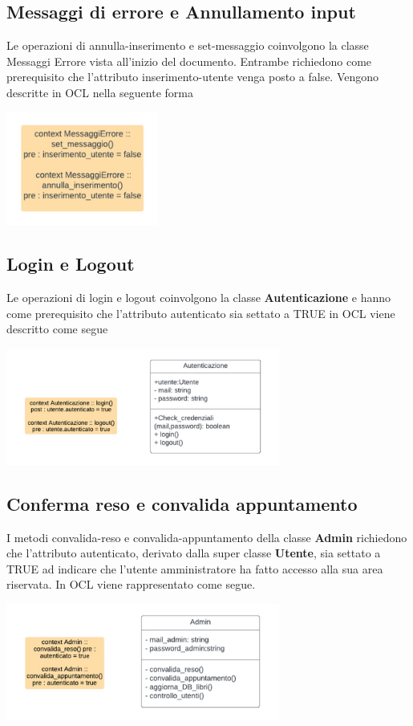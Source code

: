 \documentclass{article}
\begin{document}
\subsection{Messaggi di errore e Annullamento input}
Le operazioni di annulla-inserimento e set-messaggio coinvolgono la classe Messaggi Errore vista all'inizio del documento.
Entrambe richiedono come prerequisito che l’attributo inserimento-utente venga posto a false. Vengono descritte in OCL nella seguente forma
\begin{center}
        \includegraphics[width=50mm]{D3/Images/MessaggiErroreOCL.jpg}
\end{center}

\subsection{Login e Logout}
Le operazioni di login e  logout coinvolgono la classe \textbf{Autenticazione} e hanno come prerequisito che l’attributo autenticato sia settato a TRUE in OCL viene descritto come segue
\begin{center}
        \includegraphics[width=90mm]{D3/Images/AutenticazioneOCL.jpg}
\end{center}
\subsection{Conferma reso e convalida appuntamento}
I metodi convalida-reso e convalida-appuntamento della classe \textbf{Admin} richiedono che l’attributo autenticato, derivato dalla super classe \textbf{Utente}, sia settato a TRUE ad indicare che l’utente amministratore ha fatto accesso alla sua area riservata. In OCL viene rappresentato come segue.
\begin{center}
        \includegraphics[width=90mm]{D3/Images/AdminOCL.jpg}
\end{center}
\end{document}
